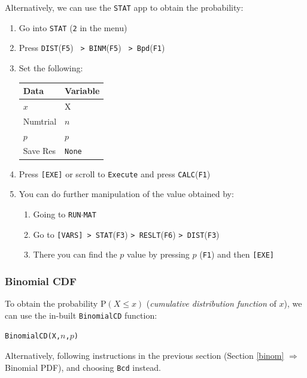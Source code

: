 \documentclass[a5paper,draft]{memoir}
\def\code#1{\texttt{#1}}
\def\runmat{\code{RUN$\cdot$MAT} }
\def\Fone{(\code{F1}) }
\def\Fthree{(\code{F3}) }
\def\Ffive{(\code{F5}) }
\def\Fsix{(\code{F6}) }
\newcommand{\addtoindex}[1]{#1\index{#1}}
\begin{document}
Alternatively, we can use the \code{STAT} app to obtain the probability:
\begin{enumerate}
	\item Go into \code{STAT} (\code{2} in the menu)
	\item Press \code{DIST}\Ffive\code{ > BINM}\Ffive\code{ > Bpd}\Fone
	\item Set the following:
	\begin{center}
		\setlength{\tabcolsep}{10pt}
		\renewcommand{\arraystretch}{1.1}
		\begin{tabular}{|l|l|}
			\hline
			Data		& Variable \\
			\hline
			$x$			& X \\
			\hline
			Numtrial	& $n$ \\
			\hline
			$p$			& $p$ \\
			\hline
			Save Res	& \code{None} \\
			\hline
		\end{tabular}
	\end{center}
	\item Press \code{[EXE]} or scroll to \code{Execute} and press \code{CALC}\Fone
	\item You can do further manipulation of the value obtained by:
	\begin{enumerate}
		\item Going to \runmat
		\item Go to \code{[VARS] > STAT}\Fthree\code{> RESLT}\Fsix\code{> DIST}\Fthree
		\item There you can find the $p$ value by pressing $p$ \Fone and then \code{[EXE]}
	\end{enumerate} 
\end{enumerate}

\subsubsection{Binomial CDF}

To obtain the probability $\textrm{P}(X \leq x)$ (\textit{cumulative distribution function} of $x$), we can use the in-built \code{\addtoindex{BinomialCD}} function:

\begin{center}
	\code{BinomialCD(X,$n$,$p$)}
\end{center}

Alternatively, following instructions in the previous section (Section \ref{binom} $\Rightarrow$ Binomial PDF), and choosing \code{Bcd} instead. 
\end{document}
